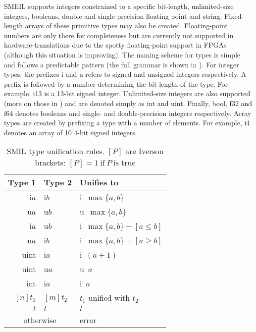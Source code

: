 SMEIL supports integers constrained to a specific bit-length, unlimited-size
integers, booleans, double and single precision floating point and
string. Fixed-length arrays of these primitive types may also be
created. Floating-point numbers are only there for completeness but are
currently not supported in hardware-translations due to the spotty
floating-point support in FPGAs (although this situation is improving). The
naming scheme for types is simple and follows a predictable pattern (the full
grammar is shown in ). For integer types, the prefixes
{\ttfamily i} and {\ttfamily u} refers to signed and unsigned integers
respectively. A prefix is followed by a number determining the bit-length of the
type. For example, {\ttfamily i13} is a 13-bit signed integer. Unlimited-size
integers are also supported (more on those in ) and are denoted
simply as {\ttfamily int} and {\ttfamily uint}. Finally, {\ttfamily bool},
{\ttfamily f32} and {\ttfamily f64} denotes booleans and single- and
double-precision integers respectively. Array types are created by prefixing a
type with a number of elements. For example, {\ttfamily [10]i4} denotes an array
of 10 4-bit signed integers.

\begin{table}
  \centering
  \begin{tabular}{rll}
    \toprule
    Type 1 & Type 2 & Unifies to \\
    \midrule
    i$a$ & i$b$ & i~$\max\{a, b\}$\\
    u$a$ & u$b$ & u~$\max\{a, b\} $\\
    i$a$ & u$b$ & i~$\max\{a, b\} + [a \leq b]$\\
    u$a$ & i$b$ & i~$\max\{a, b\} + [a \geq b]$\\
    uint & i$a$ & i~$(a + 1)$\\
    uint & u$a$ & u~$a$\\
    int & i$a$ & i~$a$\\
    $[n]t_1$ & $[m]t_2$ & $t_1$ unified with $t_2$\\
    $t$ & $t$ & $t$ \\
    \multicolumn{2}{c}{otherwise} & error\\
    \bottomrule
  \end{tabular}
  \caption{SMIL type unification rules. $[P]$ are Iverson brackets:
    $[P] = 1~\text{if}~P~\text{is true}$}
  \label{tab:typeuni}
\end{table}

  
